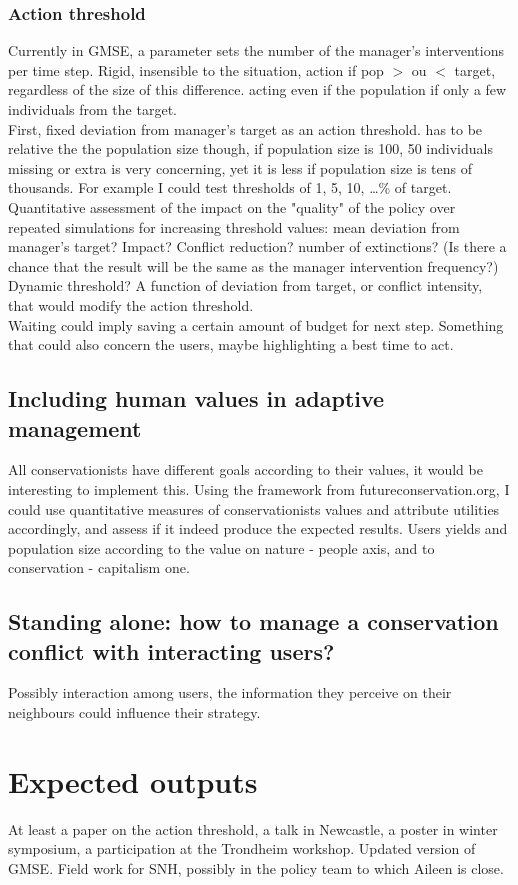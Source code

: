 \documentclass[12pt,a4paper]{article}
\begin{document}
\subsubsection{Action threshold}
Currently in GMSE, a parameter sets the number of the manager's interventions per time step. Rigid, insensible to the situation, action if pop $>$ ou $<$ target, regardless of the size of this difference. acting even if the population if only a few individuals from the target.\\
First, fixed deviation from manager's target as an action threshold. has to be relative the the population size though, if population size is 100, 50 individuals missing or extra is very concerning, yet it is less if population size is tens of thousands. For example I could test thresholds of 1, 5, 10, \dots \% of target.\\ 
Quantitative assessment of the impact on the "quality" of the policy over repeated simulations for increasing threshold values: mean deviation from manager's target? Impact? Conflict reduction? number of extinctions? (Is there a chance that the result will be the same as the manager intervention frequency?)\\
Dynamic threshold? A function of deviation from target, or conflict intensity, that would modify the action threshold.\\
Waiting could imply saving a certain amount of budget for next step. Something that could also concern the users, maybe highlighting a best time to act.

\subsection{Including human values in adaptive management}

All conservationists have different goals according to their values, it would be interesting to implement this. Using the framework from futureconservation.org, I could use quantitative measures of conservationists values and attribute utilities accordingly, and assess if it indeed produce the expected results. Users yields and population size according to the value on nature - people axis, and to conservation - capitalism one. 

\subsection{Standing alone: how to manage a conservation conflict with interacting users?}

Possibly interaction among users, the information they perceive on their neighbours could influence their strategy.

\section{Expected outputs}

At least a paper on the action threshold, a talk in Newcastle, a poster in winter symposium, a participation at the Trondheim workshop. Updated version of GMSE. Field work for SNH, possibly in the policy team to which Aileen is close.

\newpage

\nocite{*}
\end{document}
